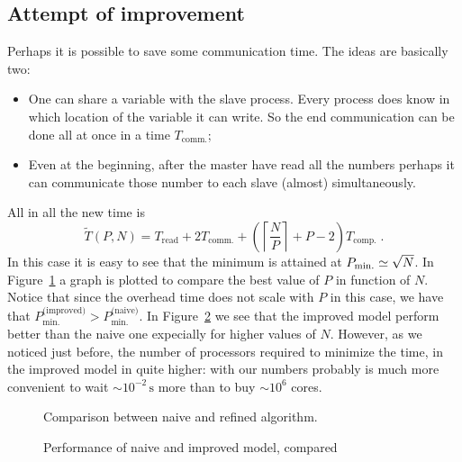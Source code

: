 \documentclass[11pt,a4paper]{article}
\newcommand{\mr}{\ensuremath{\mathrm}}
\numberwithin{equation}{section}
\begin{document}
\subsection{Attempt of improvement}
Perhaps it is possible to save some communication time. The ideas are basically two:
\begin{itemize}
    \item  One can share a variable with the slave process. Every process does know in which location of the variable it can write. So the end communication can be done all at once in a time $T_{\text{comm.}}$;
    \item Even at the beginning, after the master have read all the numbers perhaps it can communicate those number to each slave (almost) simultaneously.
\end{itemize}    
All in all the new time is
\begin{equation}
\tilde{T}(P,N) = T_{\text{read}} + 2T_{\text{comm.}} + \left(\left\lceil\frac{N}{P}\right\rceil+P-2\right)T_{\text{comp.}}\;.
\end{equation}
In this case it is easy to see that the minimum is attained at $P_{\mr{min.}} \simeq \sqrt{N}$. In Figure~\ref{fig:th_mod_4} a graph is plotted to compare the best value of $P$ in function of $N$. Notice that since the overhead time does not scale with $P$ in this case, we have that $P_{\text{min.}}^{\text{(improved)}} > P_{\text{min.}}^{\text{(naive)}}$. In Figure~\ref{fig:th_mod_5} we see that the improved model perform better than the naive one expecially for higher values of $N$. However, as we noticed just before, the number of processors required to minimize the time, in the improved model in quite higher: with our numbers probably is much more convenient to wait $\sim 10^{-2}\,\text{s}$ more than to buy $\sim 10^6$ cores. 
\begin{figure}[htbp]
    \centering
    
    \caption{Comparison between naive and refined algorithm.}
    \label{fig:th_mod_4}
\end{figure}

\begin{figure}[htbp]
    \centering
    \hspace*{-1cm}
    
    \caption{Performance of naive and improved model, compared}
    \label{fig:th_mod_5}
\end{figure}
\end{document}
